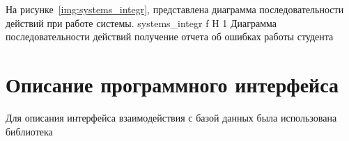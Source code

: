 На рисунке~\ref{img:systems_integr}, представлена диаграмма последовательности действий при работе системы.
{systems_integr} %
{f} %
{H} %
{1\textwidth} %
{Диаграмма последовательности действий получение отчета об ошибках работы студента} %

\section{Описание программного интерфейса}
Для описания интерфейса взаимодействия с базой данных была использована библиотека













